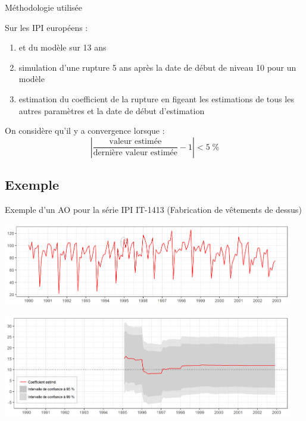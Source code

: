 \documentclass[10pt,xcolor=table,color={dvipsnames,usenames},ignorenonframetext,usepdftitle=false,french]{beamer}
\begin{document}
\begin{frame}{Méthodologie utilisée}

Sur les IPI européens :

\begin{enumerate}
\def\labelenumi{\arabic{enumi}.}
\item
   et  du modèle sur
  13 ans
\item
  simulation d'une rupture 5 ans après la date de début de niveau 10
  pour un modèle 
\item
  estimation du coefficient de la rupture en figeant les estimations de
  tous les autres paramètres et la date de début d'estimation
\end{enumerate}

On considère qu'il y a convergence lorsque :
\[\left\lvert\frac{\text{valeur estimée}}{\text{dernière valeur estimée}}-1\right\rvert < 5\;\%\]

\end{frame}

\subsection{Exemple}\label{exemple}

\begin{frame}{Exemple d'un AO pour la série IPI IT-1413 (Fabrication de
vêtements de dessus)}

\centering

\includegraphics[width=0.95\textwidth]{img/AO_ipi_it1413_y.png}

\includegraphics[width=0.95\textwidth]{img/AO_ipi_it1413_est.png}

\end{frame}
\end{document}
